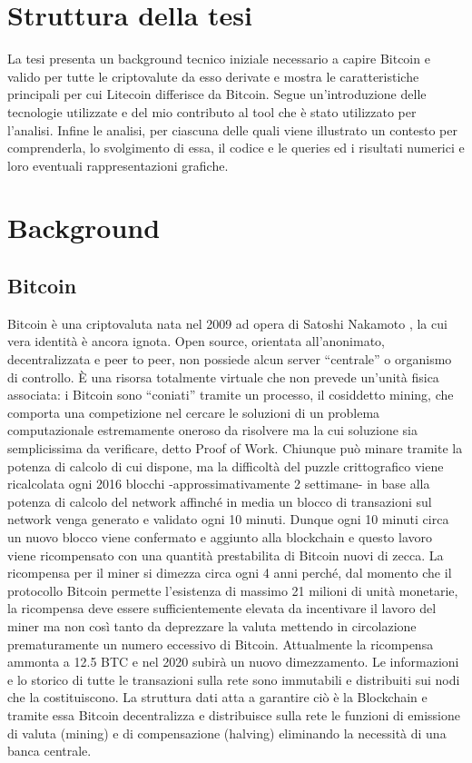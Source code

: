 \section{Struttura della tesi}
La tesi presenta un background tecnico iniziale necessario a capire Bitcoin e valido per tutte le criptovalute da esso derivate e mostra le caratteristiche principali per cui Litecoin differisce da Bitcoin. Segue un’introduzione delle tecnologie utilizzate e del mio contributo al tool che è stato utilizzato per l’analisi. Infine le analisi, per ciascuna delle quali viene illustrato un contesto per comprenderla, lo svolgimento di essa, il codice e le queries ed i risultati numerici e loro eventuali rappresentazioni grafiche.






\section{Background}
\subsection{Bitcoin}
Bitcoin è una criptovaluta nata nel 2009 ad opera di Satoshi Nakamoto \cite{bitcoinpaper}, la cui vera identità è ancora ignota. Open source, orientata all’anonimato, decentralizzata e peer to peer, non possiede alcun server “centrale” o organismo di controllo. È una risorsa totalmente virtuale che non prevede un’unità fisica associata: i Bitcoin sono “coniati” tramite un processo, il cosiddetto mining, che comporta una competizione nel cercare le soluzioni di un problema computazionale estremamente oneroso da risolvere ma la cui soluzione sia semplicissima da verificare, detto Proof of Work.
Chiunque può minare tramite la potenza di calcolo di cui dispone, ma la difficoltà del puzzle crittografico viene ricalcolata ogni 2016 blocchi -approssimativamente 2 settimane- in base alla potenza di calcolo del network affinché in media un blocco di transazioni sul network venga generato e validato ogni 10 minuti. Dunque ogni 10 minuti circa un nuovo blocco viene confermato e aggiunto alla blockchain e questo lavoro viene ricompensato con una quantità prestabilita di Bitcoin nuovi di zecca. 
La ricompensa per il miner si dimezza circa ogni 4 anni perché, dal momento che il protocollo Bitcoin permette l’esistenza di massimo 21 milioni di unità monetarie, la ricompensa deve essere sufficientemente elevata da incentivare il lavoro del miner ma non così tanto da deprezzare la valuta mettendo in circolazione prematuramente un numero eccessivo di Bitcoin. Attualmente la ricompensa ammonta a 12.5 BTC e nel 2020 subirà un nuovo dimezzamento.\cite{blockonomi}
Le informazioni e lo storico di tutte le transazioni sulla rete sono immutabili e distribuiti sui nodi che la costituiscono. La struttura dati atta a garantire ciò è la Blockchain e tramite essa Bitcoin decentralizza e distribuisce sulla rete le funzioni di emissione di valuta (mining) e di compensazione (halving) eliminando la necessità di una banca centrale.



